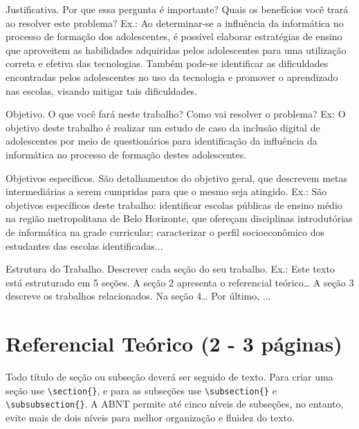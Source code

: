  Justificativa. Por que essa pergunta é importante? Quais os benefícios você trará ao resolver este problema?
	Ex.: Ao determinar-se a influência da informática no processo de formação dos adolescentes, é possível elaborar estratégias de ensino que aproveitem as habilidades adquiridas pelos adolescentes para uma utilização correta e efetiva das tecnologias. Também pode-se identificar as dificuldades encontradas pelos adolescentes no uso da tecnologia e promover o aprendizado nas escolas, visando mitigar tais dificuldades.
	
 Objetivo. O que você fará neste trabalho? Como vai resolver o problema?
	Ex: O objetivo deste trabalho é realizar um estudo de caso da inclusão digital de adolescentes por meio de questionários para identificação da influência da informática no processo de formação destes adolescentes.
	
 Objetivos específicos. São detalhamentos do objetivo geral, que descrevem metas intermediárias a serem cumpridas para que o mesmo seja atingido.
	Ex.: São objetivos específicos deste trabalho: identificar escolas públicas de ensino médio na região metropolitana de Belo Horizonte, que ofereçam disciplinas introdutórias de informática na grade curricular; caracterizar o perfil socioeconômico dos estudantes das escolas identificadas...
	
 Estrutura do Trabalho. Descrever cada seção do seu trabalho.	
	Ex.: Este texto está estruturado em 5 seções. A seção 2 apresenta o referencial teórico… A seção 3 descreve os trabalhos relacionados. Na seção 4… Por último, ...


\section{\esp Referencial Teórico (2 - 3 páginas)}

Todo título de seção ou subseção deverá ser seguido de texto.  Para criar uma seção use \verb|\section{}|, e para as subseções use \verb|\subsection{}| e \verb|\subsubsection{}|. A ABNT permite até cinco níveis de subseções, no entanto, evite mais de dois níveis para melhor organização e fluidez do texto.


